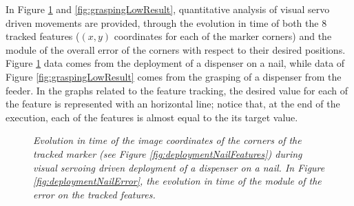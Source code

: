 In Figure \ref{fig:deploymentNailResult} and \ref{fig:graspingLowResult}, quantitative analysis of visual servo driven movements are provided, through the evolution in time of both the 8 tracked features ($(x,y)$ coordinates for each of the marker corners) and the module of the overall error of the corners with respect to their desired positions. Figure \ref{fig:deploymentNailResult} data comes from the deployment of a dispenser on a nail, while data of Figure \ref{fig:graspingLowResult} comes from the grasping of a dispenser from the feeder. In the graphs related to the feature tracking, the desired value for each of the feature is represented with an horizontal line; notice that, at the end of the execution, each of the features is almost equal to the its target value.


\begin{figure}
	\centering
	\caption{\textit{Evolution in time of the image coordinates of the corners of the tracked marker (see Figure \ref{fig:deploymentNailFeatures}) during visual servoing driven deployment of a dispenser on a nail. In Figure \ref{fig:deploymentNailError}, the evolution in time of the module of the error on the tracked features.}}
	\label{fig:deploymentNailResult}
\end{figure}

